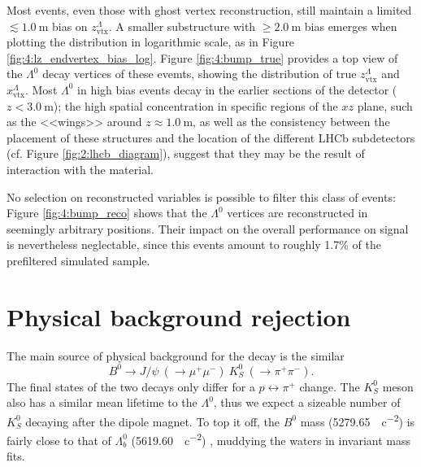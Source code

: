 Most \demonstratorshort events, even those with ghost vertex reconstruction, still maintain a limited $\lesssim \SI{1.0}{\meter}$ bias on $z_\text{vtx}^\Lambda$.
A smaller substructure with $\geq \SI{2.0}{\meter}$ bias emerges when plotting the distribution in logarithmic scale, as in Figure \ref{fig:4:lz_endvertex_bias_log}.
Figure \ref{fig:4:bump_true} provides a top view of the $\Lambda^0$ decay vertices of these evemts, showing the distribution of true $z_\text{vtx}^\Lambda$ and $x_\text{vtx}^\Lambda$.
Most $\Lambda^0$ in high bias events decay in the earlier sections of the detector ($z<\SI{3.0}{\meter}$);
the high spatial concentration in specific regions of the $xz$ plane, such as the <<wings>> around $z\approx \SI{1.0}{\meter}$, as well as the consistency between the placement of these structures and the location of the different LHCb subdetectors (cf. Figure \ref{fig:2:lhcb_diagram}), suggest that they may be the result of interaction with the material.

No selection on reconstructed variables is possible to filter this class of events:
Figure \ref{fig:4:bump_reco} shows that the $\Lambda^0$ vertices are reconstructed in seemingly arbitrary positions.
Their impact on the overall performance on signal is nevertheless neglectable, since this events amount to roughly 1.7\% of the prefiltered simulated sample.

\section{Physical background rejection}
\label{sec:4:phys_bkg}

The main source of physical background for the \demonstratorfull decay is the similar
\begin{equation}
	B^0 \rightarrow J/\psi~(\rightarrow \mu^+ \mu^-)~K_S^0~(\rightarrow \pi^+ \pi^-).
\end{equation}
The final states of the two decays only differ for a $p \leftrightarrow \pi^+$ change.
The $K_S^0$ meson also has a similar mean lifetime to the $\Lambda^0$, thus we expect a sizeable number of $K_S^0$ decaying after the dipole magnet.
To top it off, the $B^0$ mass (\SI{5279.65}{\mev\per c\squared}) is fairly close to that of $\Lambda_b^0$ (\SI{5619.60}{\mev\per c\squared}) \cite{PDG}, muddying the waters in invariant mass fits.

